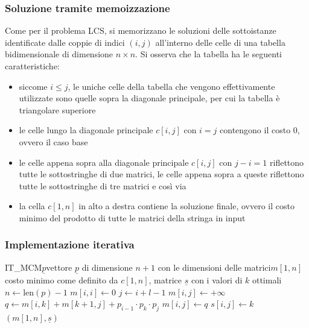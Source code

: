 \subsubsection*{Soluzione tramite memoizzazione}
Come per il problema LCS, si memorizzano le soluzioni delle sottoistanze identificate dalle coppie di indici \((i, j)\)
all'interno delle celle di una tabella bidimensionale di dimensione \(n \times n\). Si osserva che la tabella ha
le seguenti caratteristiche:
\begin{itemize}
	\item siccome \(i \leq j\), le uniche celle della tabella che vengono effettivamente utilizzate sono quelle sopra
	la diagonale principale, per cui la tabella è triangolare superiore
	\item le celle lungo la diagonale principale \(c[i, j]\) con \(i=j\) contengono il costo \(0\), ovvero il caso base
	\item le celle appena sopra alla diagonale principale \(c[i, j]\) con \(j-i = 1\) riflettono tutte le sottostringhe
	di due matrici, le celle appena sopra a queste riflettono tutte le sottostringhe di tre matrici e così via
	\item la cella \(c[1, n]\) in alto a destra contiene la soluzione finale, ovvero il costo minimo del prodotto di tutte
	le matrici della stringa in input
\end{itemize}

\subsubsection*{Implementazione iterativa}
\vspace{-7pt}
\begin{algo}{IT\_MCM}{$\underline{p}$}{vettore $\underline{p}$ di dimensione $n+1$ con le dimensioni delle matrici}{$m[1, n]$ costo minimo come definito da $c[1,n]$, matrice $\underline{s}$ con i valori di $k$ ottimali}
	\State \(n \gets \text{len}(p) - 1\)
	 \(m[i, i] \gets 0\)  \EndFor
	 
		 
			\State \(j \gets i + l - 1\)
			\State \(m[i, j] \gets +\infty\) 
			 
				\State \(q \gets m[i, k] + m[k+1, j] + p_{i-1} \cdot p_k \cdot p_j\) 
				 
					\State \(m[i, j] \gets q\) 
					\State \(s[i, j] \gets k\) 
				\EndIf
			\EndFor
		\EndFor
	\EndFor
	\State \Return \((m[1, n], \underline{s})\)
\end{algo}

